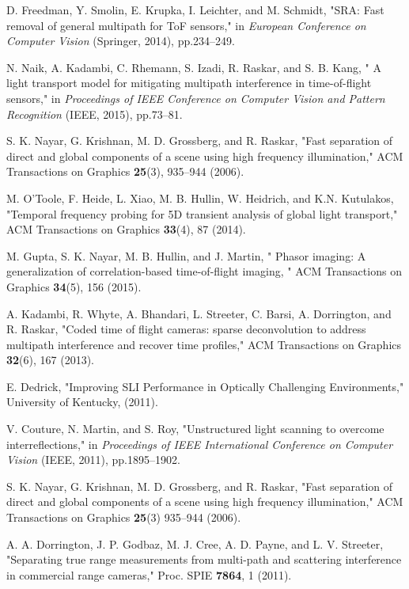 \documentclass[10pt]{article}
\begin{document}
\begin{thebibliography}{99}
  D. Freedman, Y. Smolin, E. Krupka,  I. Leichter, and M. Schmidt, "SRA: Fast removal of general multipath for ToF sensors," in {\itshape  European Conference on Computer Vision } (Springer, 2014), pp.234--249.

 N. Naik, A. Kadambi, C. Rhemann, S. Izadi,  R. Raskar, and S. B. Kang, " A light transport model for mitigating multipath interference in time-of-flight sensors," in {\itshape Proceedings of IEEE Conference on Computer Vision and Pattern Recognition} (IEEE, 2015), pp.73--81.

  S. K. Nayar,  G. Krishnan, M. D. Grossberg,  and  R. Raskar, "Fast separation of direct and global components of a scene using high frequency illumination," ACM Transactions on Graphics {\bfseries 25}(3), 935--944 (2006).

 M. O'Toole,  F. Heide, L. Xiao, M. B. Hullin, W. Heidrich,  and K.N. Kutulakos,  "Temporal frequency probing for 5D transient analysis of global light transport," ACM Transactions on Graphics {\bfseries 33}(4), 87 (2014).

 M. Gupta,  S. K. Nayar, M. B. Hullin, and  J. Martin, " Phasor imaging: A generalization of correlation-based time-of-flight imaging, " ACM Transactions on Graphics {\bfseries 34}(5), 156 (2015).

  A. Kadambi, R. Whyte, A. Bhandari,  L. Streeter, C. Barsi, A. Dorrington,  and R. Raskar,   "Coded time of flight cameras: sparse deconvolution to address multipath interference and recover time profiles," ACM Transactions on Graphics  {\bfseries 32}(6), 167 (2013).

  E. Dedrick, "Improving SLI Performance in Optically Challenging Environments," University of Kentucky, (2011).
 
 V. Couture, N. Martin, and S. Roy, "Unstructured light scanning to overcome interreflections,"  in {\itshape Proceedings of IEEE International Conference on Computer Vision} (IEEE, 2011), pp.1895--1902.

 S. K. Nayar, G. Krishnan, M. D. Grossberg, and R. Raskar, "Fast separation of direct and global components of a scene using high frequency illumination,"  ACM Transactions on Graphics  {\bfseries 25}(3) 935--944 (2006).

 A. A. Dorrington,  J. P. Godbaz, M. J. Cree, A. D. Payne,  and L. V. Streeter, "Separating true range measurements from multi-path and scattering interference in commercial range cameras,"  Proc. SPIE {\bfseries 7864}, 1 (2011).


\end{thebibliography}
\end{document}
